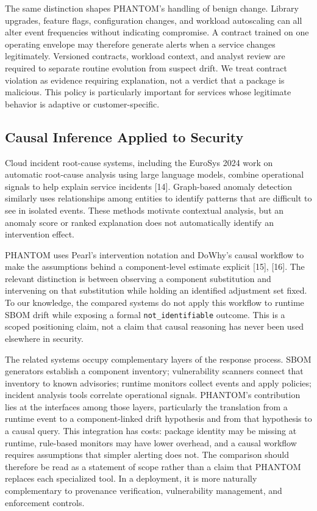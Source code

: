 \documentclass[conference]{IEEEtran}
\begin{document}
The same distinction shapes PHANTOM's handling of benign change. Library upgrades, feature flags, configuration changes, and workload autoscaling can all alter event frequencies without indicating compromise. A contract trained on one operating envelope may therefore generate alerts when a service changes legitimately. Versioned contracts, workload context, and analyst review are required to separate routine evolution from suspect drift. We treat contract violation as evidence requiring explanation, not a verdict that a package is malicious. This policy is particularly important for services whose legitimate behavior is adaptive or customer-specific.

\subsection{Causal Inference Applied to Security}
Cloud incident root-cause systems, including the EuroSys 2024 work on automatic root-cause analysis using large language models, combine operational signals to help explain service incidents [14]. Graph-based anomaly detection similarly uses relationships among entities to identify patterns that are difficult to see in isolated events. These methods motivate contextual analysis, but an anomaly score or ranked explanation does not automatically identify an intervention effect.

PHANTOM uses Pearl's intervention notation and DoWhy's causal workflow to make the assumptions behind a component-level estimate explicit [15], [16]. The relevant distinction is between observing a component substitution and intervening on that substitution while holding an identified adjustment set fixed. To our knowledge, the compared systems do not apply this workflow to runtime SBOM drift while exposing a formal \texttt{not\_identifiable} outcome. This is a scoped positioning claim, not a claim that causal reasoning has never been used elsewhere in security.

The related systems occupy complementary layers of the response process. SBOM generators establish a component inventory; vulnerability scanners connect that inventory to known advisories; runtime monitors collect events and apply policies; incident analysis tools correlate operational signals. PHANTOM's contribution lies at the interfaces among those layers, particularly the translation from a runtime event to a component-linked drift hypothesis and from that hypothesis to a causal query. This integration has costs: package identity may be missing at runtime, rule-based monitors may have lower overhead, and a causal workflow requires assumptions that simpler alerting does not. The comparison should therefore be read as a statement of scope rather than a claim that PHANTOM replaces each specialized tool. In a deployment, it is more naturally complementary to provenance verification, vulnerability management, and enforcement controls.
\end{document}
